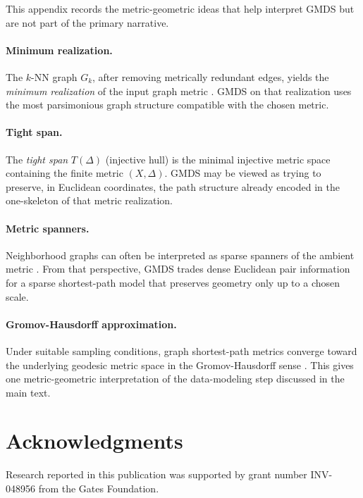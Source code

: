 \documentclass[11pt]{article}
\newcommand{\Gk}{G_k}
\theoremstyle{definition}
\theoremstyle{plain}
\theoremstyle{remark}
\begin{document}
This appendix records the metric-geometric ideas that help interpret GMDS but
are not part of the primary narrative.

\paragraph{Minimum realization.}
The $k$-NN graph $\Gk$, after removing metrically redundant edges, yields the
\emph{minimum realization} of the input graph metric
\citep{dress1984trees, imrich1984optimal}.  GMDS on that realization uses the
most parsimonious graph structure compatible with the chosen metric.

\paragraph{Tight span.}
The \emph{tight span} $T(\Delta)$ (injective hull) \citep{dress1984trees,
isbell1964six} is the minimal injective metric space containing the finite
metric $(X,\Delta)$.  GMDS may be viewed as trying to preserve, in Euclidean
coordinates, the path structure already encoded in the one-skeleton of that
metric realization.

\paragraph{Metric spanners.}
Neighborhood graphs can often be interpreted as sparse spanners of the ambient
metric \citep{althofer1993sparse, har-peled2006low}.  From that perspective,
GMDS trades dense Euclidean pair information for a sparse shortest-path model
that preserves geometry only up to a chosen scale.

\paragraph{Gromov-Hausdorff approximation.}
Under suitable sampling conditions, graph shortest-path metrics converge toward
the underlying geodesic metric space in the Gromov-Hausdorff sense
\citep{gromov1999metric, latschev2001riemannian, bernstein2000graph}.  This
gives one metric-geometric interpretation of the data-modeling step discussed in
the main text.


\section*{Acknowledgments}
Research reported in this publication was supported by grant number
INV-048956 from the Gates Foundation.



\end{document}
